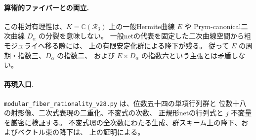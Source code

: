\paragraph{算術的ファイバーとの両立.}
この相対有理性は、$K=\mathbb C(\mathcal R_3)$ 上の一般Hermite曲線 $E$ や
Prym-canonical二次曲線 $D_\alpha$ の分裂を意味しない。
一般netの代表を固定した二次曲線空間から粗モジュライへ移る際には、
上の有限安定化群による降下が残る。
従って $E$ の周期・指数三、$D_\alpha$ の指数二、
および $E\times D_\alpha$ の指数六という主張とは矛盾しない。

\paragraph{再現入口.}
\nolinkurl{modular_fiber_rationality_v28.py} は、位数五十四の単項行列群と
位数十八の射影像、二次式表現の二重化、不変式の次数、
正規形netの行列式と $j$ 不変量を厳密に検証する。
不変式環の全次数にわたる生成、群スキーム上の降下、およびベクトル束の降下は、
上の証明による。
